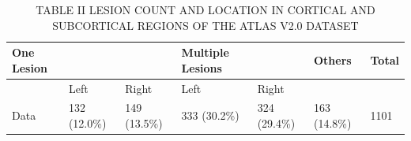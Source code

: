 \begin{table}[htbp]
\centering
\caption{TABLE II LESION COUNT AND LOCATION IN CORTICAL AND SUBCORTICAL REGIONS OF THE ATLAS V2.0 DATASET}
\label{tab:table\_002}
\begin{tabular}{lllllll}
\hline
One Lesion &  &  & Multiple Lesions &  & Others & Total \\
\hline
 & Left & Right & Left & Right &  &  \\
Data & 132 (12.0\%) & 149 (13.5\%) & 333 (30.2\%) & 324 (29.4\%) & 163 (14.8\%) & 1101 \\
\hline
\end{tabular}
\end{table}
